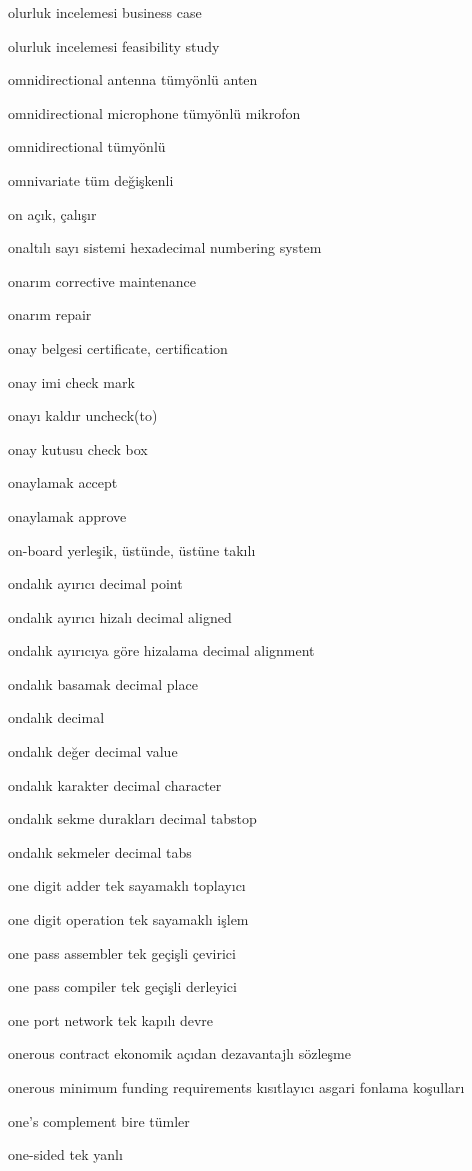 \documentclass[12pt,fleqn]{article}\usepackage{../../common}
\begin{document}
olurluk incelemesi business case

olurluk incelemesi feasibility study

omnidirectional antenna tümyönlü anten

omnidirectional microphone tümyönlü mikrofon

omnidirectional tümyönlü

omnivariate tüm değişkenli

on açık, çalışır

onaltılı sayı sistemi hexadecimal numbering system

onarım corrective maintenance

onarım repair

onay belgesi certificate, certification

onay imi check mark

onayı kaldır uncheck(to)

onay kutusu check box

onaylamak accept

onaylamak approve

on-board yerleşik, üstünde, üstüne takılı

ondalık ayırıcı decimal point

ondalık ayırıcı hizalı decimal aligned

ondalık ayırıcıya göre hizalama decimal alignment

ondalık basamak decimal place

ondalık decimal

ondalık değer decimal value

ondalık karakter decimal character

ondalık sekme durakları decimal tabstop

ondalık sekmeler decimal tabs

one digit adder tek sayamaklı toplayıcı

one digit operation tek sayamaklı işlem

one pass assembler tek geçişli çevirici

one pass compiler tek geçişli derleyici

one port network tek kapılı devre

onerous contract ekonomik açıdan dezavantajlı sözleşme

onerous minimum funding requirements kısıtlayıcı asgari fonlama koşulları

one's complement bire tümler

one-sided tek yanlı
\end{document}
